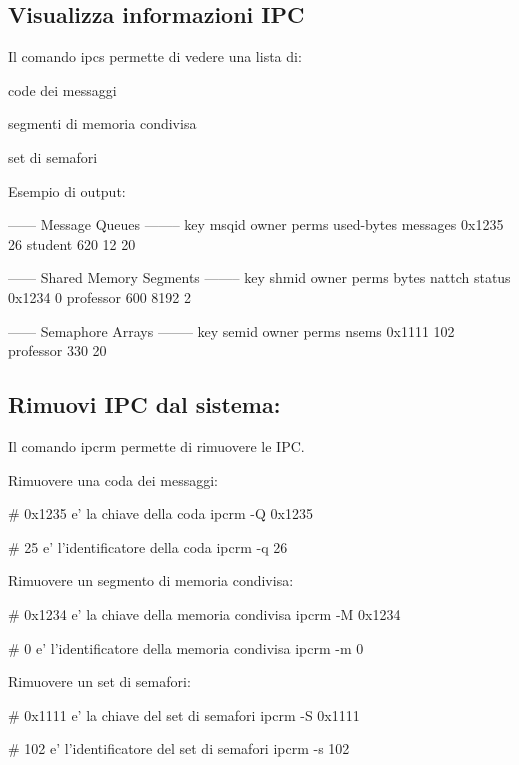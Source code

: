 \subsection*{Visualizza informazioni I\+PC}

Il comando {\ttfamily ipcs} permette di vedere una lista di\+:
\begin{DoxyItemize}
\item code dei messaggi
\item segmenti di memoria condivisa
\item set di semafori
\end{DoxyItemize}

Esempio di output\+: 
\begin{DoxyCode}
------ Message Queues --------
key     msqid  owner    perms  used-bytes  messages
0x1235  26     student  620    12          20

------ Shared Memory Segments --------
key     shmid  owner      perms  bytes  nattch  status
0x1234  0      professor  600    8192   2

------ Semaphore Arrays --------
key     semid  owner      perms  nsems
0x1111  102    professor  330    20
\end{DoxyCode}


\subsection*{Rimuovi I\+PC dal sistema\+:}

Il comando {\ttfamily ipcrm} permette di rimuovere le I\+PC.

Rimuovere una coda dei messaggi\+: 
\begin{DoxyCode}
# 0x1235 e' la chiave della coda
ipcrm -Q 0x1235

# 25 e' l'identificatore della coda
ipcrm -q 26
\end{DoxyCode}


Rimuovere un segmento di memoria condivisa\+: 
\begin{DoxyCode}
# 0x1234 e' la chiave della memoria condivisa
ipcrm -M 0x1234

# 0 e' l'identificatore della memoria condivisa
ipcrm -m 0
\end{DoxyCode}


Rimuovere un set di semafori\+: 
\begin{DoxyCode}
# 0x1111 e' la chiave del set di semafori
ipcrm -S 0x1111

# 102 e' l'identificatore del set di semafori
ipcrm -s 102
\end{DoxyCode}
 